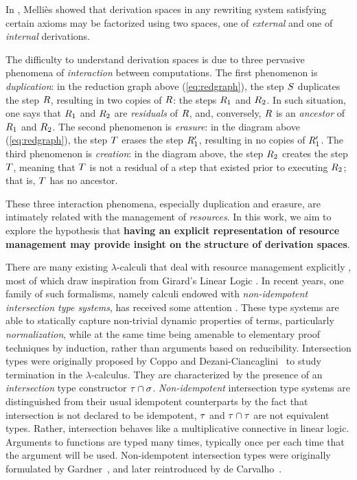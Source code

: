 In \cite{DBLP:conf/ctcs/Mellies97}, Melli\`es showed that
derivation spaces in any rewriting system satisfying certain axioms
may be factorized using two spaces,
one of {\em external} and one of {\em internal} derivations.



The difficulty to understand derivation spaces is due to three pervasive phenomena
of \emph{interaction} between computations.
The first phenomenon is \emph{duplication}:
in the reduction graph above (\ref{eq:redgraph}), the step $S$ duplicates the step $R$,
resulting in two copies of $R$: the steps $R_1$ and $R_2$.
In such situation, one says that $R_1$ and $R_2$ are \emph{residuals} of $R$,
and, conversely, $R$ is an \emph{ancestor} of $R_1$ and $R_2$.
The second phenomenon is \emph{erasure}:
in the diagram above (\ref{eq:redgraph}), the step $T$ erases the step $R'_1$,
resulting in no copies of $R'_1$.
The third phenomenon is \emph{creation}:
in the diagram above, the step $R_2$ creates the step $T$,
meaning that $T$ is not a residual of a step that existed prior
to executing $R_2$; that is, $T$ has no ancestor.

These three interaction phenomena, especially duplication and erasure,
are intimately related with the management of \emph{resources}.
In this work, we aim to explore the hypothesis that {\bf having an explicit
representation of resource management may provide insight on
the structure of derivation spaces}.

There are many existing $\lambda$-calculi that deal with resource management explicitly
\cite{boudol1993lambda,ehrhard2003differential,kesner2007resource,kesner2009prismoid},
most of which draw inspiration from Girard's Linear Logic \cite{girard1987linear}.
In recent years, one family of such formalisms, namely calculi endowed with
{\em non-idempotent intersection type systems},
has received some attention
\cite{ehrhard2012collapsing,bernadet2013non,bucciarelli2014inhabitation,bucciarelli2017non,kesner2016reasoning,thesisvial,KRV18}.
These type systems are able to statically capture non-trivial
dynamic properties of terms, particularly {\em normalization},
while at the same time being amenable to elementary proof techniques by induction,
rather than arguments based on reducibility.
Intersection types were originally proposed by
Coppo and Dezani-Ciancaglini~\cite{DBLP:journals/aml/CoppoD78}
to study termination in the $\lambda$-calculus.
They are characterized by the presence of an {\em intersection} type constructor $\tau \cap \sigma$.
{\em Non-idempotent} intersection type systems are distinguished from their usual idempotent
counterparts by the fact that intersection
is not declared to be idempotent, \ie $\tau$ and $\tau \cap \tau$ are not equivalent types.
Rather, intersection behaves like a multiplicative connective in linear logic.
Arguments to functions are typed many times, typically once
per each time that the argument will be used.
Non-idempotent intersection types were originally formulated by
Gardner~\cite{gardner1994discovering},
and later reintroduced by de Carvalho~\cite{carvalho2007semantiques}.

